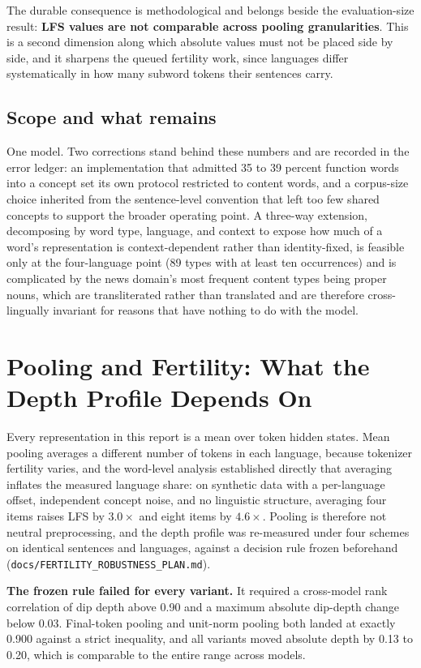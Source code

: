 \documentclass[11pt,a4paper]{article}
\begin{document}
The durable consequence is methodological and belongs beside the
evaluation-size result: \textbf{LFS values are not comparable across pooling
granularities}. This is a second dimension along which absolute values must
not be placed side by side, and it sharpens the queued fertility work, since
languages differ systematically in how many subword tokens their sentences
carry.

\subsection{Scope and what remains}
One model. Two corrections stand behind these numbers and are recorded in
the error ledger: an implementation that admitted 35 to 39 percent function
words into a concept set its own protocol restricted to content words, and a
corpus-size choice inherited from the sentence-level convention that left
too few shared concepts to support the broader operating point. A three-way
extension, decomposing by word type, language, and context to expose how
much of a word's representation is context-dependent rather than
identity-fixed, is feasible only at the four-language point (89 types with
at least ten occurrences) and is complicated by the news domain's most
frequent content types being proper nouns, which are transliterated rather
than translated and are therefore cross-lingually invariant for reasons that
have nothing to do with the model.

\section{Pooling and Fertility: What the Depth Profile Depends On}
\label{sec:pooling}
Every representation in this report is a mean over token hidden states.
Mean pooling averages a different number of tokens in each language, because
tokenizer fertility varies, and the word-level analysis established directly
that averaging inflates the measured language share: on synthetic data with a
per-language offset, independent concept noise, and no linguistic structure,
averaging four items raises LFS by $3.0\times$ and eight items by
$4.6\times$. Pooling is therefore not neutral preprocessing, and the
depth profile was re-measured under four schemes on identical sentences and
languages, against a decision rule frozen beforehand
(\texttt{docs/FERTILITY\_ROBUSTNESS\_PLAN.md}).

\textbf{The frozen rule failed for every variant.} It required a cross-model
rank correlation of dip depth above 0.90 and a maximum absolute dip-depth
change below 0.03. Final-token pooling and unit-norm pooling both landed at
exactly 0.900 against a strict inequality, and all variants moved absolute
depth by 0.13 to 0.20, which is comparable to the entire range across
models.
\end{document}
